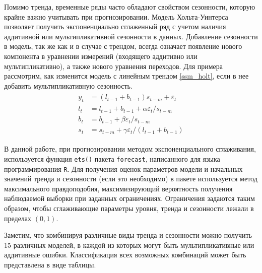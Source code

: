 Помимо тренда, временные ряды часто обладают свойством сезонности, которую крайне важно учитывать при прогнозировании. Модель Хольта-Уинтерса позволяет получить экспоненциально сглаженный ряд с учетом наличия аддитивной или мультипликативной сезонности в данных. Добавление сезонности в модель, так же как и в случае с трендом, всегда означает появление нового компонента в уравнении измерений (входящего аддитивно или мультипликативно), а также нового уравнения переходов. Для примера рассмотрим, как изменится модель с линейным трендом \eqref{ssm_holt}, если в нее добавить мультипликативную сезонность.
\begin{align*}
\begin{split} 
y_t &= (l_{t-1} + b_{t-1})s_{t-m} + \varepsilon_t\\
l_t &= l_{t-1} + b_{t-1} + \alpha \varepsilon_t/s_{t-m}\\
b_t &= b_{t-1} + \beta \varepsilon_t/s_{t-m}\\
s_t &= s_{t-m} + \gamma \varepsilon_t / (l_{t-1} + b_{t-1})
\end{split}
\end{align*}

В данной работе, при прогнозировании методом экспоненциального сглаживания, используется функция \texttt{ets()} пакета \texttt{forecast}, написанного для языка программирования \texttt{R}. Для получения оценок параметров модели и начальных значений тренда и сезонности (если это необходимо) в пакете используется метод максимального правдоподобия, максимизирующий вероятность получения наблюдаемой выборки при заданных ограничениях. Ограничения задаются таким образом, чтобы сглаживающие параметры уровня, тренда и сезонности лежали в пределах $(0,1)$.

Заметим, что комбинируя различные виды тренда и сезонности можно получить 15 различных моделей, в каждой из которых могут быть мультипликативные или аддитивные ошибки. Классификация всех возможных комбинаций может быть представлена в виде таблицы.

